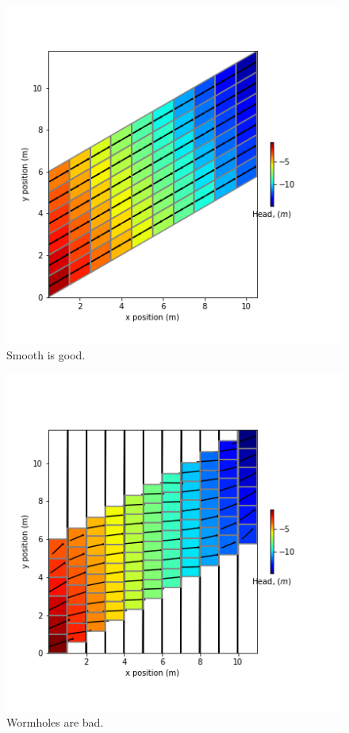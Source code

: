 \documentclass{article}
\begin{document}
\begin{figure}
	\begin{center}
	\includegraphics{../figures/worm-smth-x-i-head.png}
	\caption{Smooth is good.}
	\label{fig:worm-smth-x-i-head}
	\end{center}
\end{figure}

\begin{figure}
	\begin{center}
	\includegraphics{../figures/worm-sstp-x-a-head.png}
	\caption{Wormholes are bad.}
	\label{fig:worm-sstp-x-a-head}
	\end{center}
\end{figure}
\end{document}
